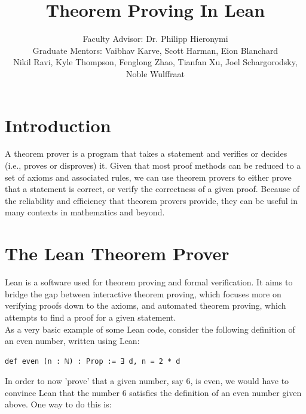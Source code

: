 \documentclass[landscape]{sciposter}
\title{\hspace{-5cm}Theorem Proving In Lean}
\author{Faculty Advisor: Dr. Philipp Hieronymi\\Graduate Mentors: Vaibhav Karve, Scott Harman, Eion Blanchard\\
Nikil Ravi, Kyle Thompson, Fenglong Zhao, Tianfan Xu, Joel Schargorodsky, Noble Wulffraat}
\begin{document}

\maketitle
\vspace{-3ex}
\begin{multicols}{4}  %



\section*{Introduction}

A theorem prover is a program that takes a statement and verifies or decides (i.e., proves or disproves) it. Given that most proof methods can be reduced to a set of axioms and associated rules, we can use theorem provers to either prove that a statement is correct, or verify the correctness of a given proof. Because of the reliability and efficiency that theorem provers provide, they can be useful in many contexts in mathematics and beyond.\\

\section*{The Lean Theorem Prover}

Lean is a software used for theorem proving and formal verification. It aims to bridge the gap between interactive theorem proving, which focuses more on verifying proofs down to the axioms, and automated theorem proving, which attempts to find a proof for a given statement.\\

As a very basic example of some Lean code, consider the following definition of an even number, written using Lean:\\

\begin{lstlisting}
def even (n : ℕ) : Prop := ∃ d, n = 2 * d
\end{lstlisting}

In order to now 'prove' that a given number, say \(6\), is even, we would have to convince Lean that the number \(6\) satisfies the definition of an even number given above. One way to do this is:\\


\end{multicols}
\end{document}
